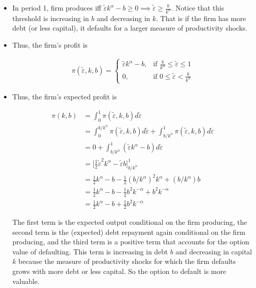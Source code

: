 \documentclass{article}
\begin{document}
\begin{itemize}

\item In period 1, firm produces iff $\tilde \varepsilon k^\alpha - b \ge 0 \implies \tilde \varepsilon \ge \frac{b}{k^\alpha}$. Notice that this threshold is increasing in $b$ and decreasing in $k$. That is if the firm has more debt (or less capital), it defaults for a larger measure of productivity shocks.

\item Thus, the firm's profit is

\begin{align*}
\pi(\tilde \varepsilon, k, b) = \begin{cases} \tilde \varepsilon k^\alpha - b, & \text{if }  \frac{b}{k^\alpha} \le \tilde\varepsilon \le 1 \\ 0, & \text{if } 0 \le \tilde\varepsilon < \frac{b}{k^\alpha} \end{cases}
\end{align*}

\item Thus, the firm's expected profit is

\begin{align*}
\pi(k,b) 
&= \int_0^1 \pi(\tilde \varepsilon, k, b) d \tilde \varepsilon\\
&= \int_{0}^{b/k^\alpha}  \pi(\tilde \varepsilon, k, b) d \tilde \varepsilon  + \int_{b/k^\alpha}^1 \pi(\tilde \varepsilon, k, b) d \tilde \varepsilon \\  &= 0+\int_{b/k^\alpha}^1 (\tilde \varepsilon k^\alpha - b) d \tilde \varepsilon \\
&= \Bigg[\frac{1}{2}\tilde \varepsilon^2 k^\alpha -\tilde \varepsilon b \Bigg]_{b/k^\alpha}^1\\
&= \frac{1}{2} k^\alpha - b - \frac{1}{2}(b/k^\alpha)^2 k^\alpha + (b/k^\alpha) b\\
&= \frac{1}{2} k^\alpha - b - \frac{1}{2}b^2 k^{-\alpha} + b^2 k^{-\alpha}\\
&= \frac{1}{2} k^\alpha - b + \frac{1}{2}b^2 k^{-\alpha}
\end{align*}

The first term is the expected output conditional on the firm producing, the second term is the (expected) debt repayment again conditional on the firm producing, and the third term is a positive term that accounts for the option value of defaulting. This term is increasing in debt $b$ and decreasing in capital $k$ because the measure of productivity shocks for which the firm defaults grows with more debt or less capital. So the option to default is more valuable.


\end{itemize}
\end{document}
